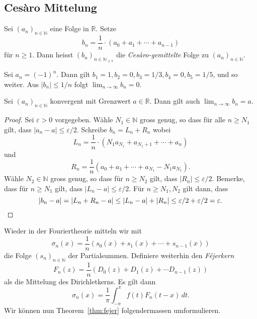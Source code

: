 \documentclass[../main.tex]{subfiles}
\begin{document}
\subsection*{Cesàro Mittelung}

\begin{definition}
  Sei ${(a_{n})}_{n \in \mathbb{N}}$ eine Folge in $\mathbb{R}$. Setze
  \[
    b_n = \frac{1}{n} \cdot (a_0 + a_1 + \cdots + a_{n-1})
  \]
  für $n \geq 1$.
  Dann heisst ${(b_{n})}_{n \in \mathbb{N_{\geq 1}}}$ die \emph{Cesàro-gemittelte}
  Folge zu ${(a_{n})}_{n \in \mathbb{N}}$.
\end{definition}

\begin{example}
  Sei $a_n = {(-1)}^n$. Dann gilt
  $b_1 = 1, b_2 = 0, b_3 = 1/3, b_4 = 0, b_5 = 1/5$, und so weiter.
  Aus $|b_n| \leq 1/n$ folgt $\lim_{n \to \infty} b_n = 0$.
\end{example}

\begin{lemma}\label{lem:cesaro-converges}
  Sei ${(a_{n})}_{n \in \mathbb{N}}$ konvergent mit Grenzwert $a \in \mathbb{R}$.
  Dann gilt auch $\lim_{n \to \infty} b_n = a$.
\end{lemma}

\begin{proof}
  Sei $\varepsilon > 0$ vorgegeben.
  Wähle $N_1 \in \mathbb{N}$ gross genug, so dass für alle $n \geq N_1$ gilt, dass
  $|a_n - a| \leq \varepsilon/2$.
  Schreibe $b_n = L_n + R_n$ wobei
  \[
    L_n = \frac{1}{n} \cdot (N_1 a_{N_1}  + a_{N_1 + 1} + \cdots + a_n)
  \]
  und
  \[
    R_n = \frac{1}{n} (a_0 + a_1 + \cdots + a_{N_1} - N_1 a_{N_1}).
  \]
  Wähle $N_2 \in \mathbb{N}$ gross genug, so dass für $n \geq N_2$ gilt,
  dass $|R_n| \leq \varepsilon/2$.
  Bemerke, dass für $n \geq N_1$ gilt, dass
  \(
    |L_n - a| \leq \varepsilon/2.
  \)
  Für $n \geq N_1, N_2$ gilt dann, dass
  \[
    |b_n - a| 
    = |L_n + R_n - a| \leq |L_n - a| + |R_n| \leq \varepsilon / 2 + \varepsilon/2 
    = \varepsilon. \qedhere
  \]
\end{proof}

Wieder in der Fouriertheorie mitteln wir mit
\[
  \sigma_n(x) = \frac{1}{n}(s_0 (x) + s_1(x) + \cdots + s_{n-1}(x))
\]
die Folge ${(s_{n})}_{n \in \mathbb{N}}$ der Partialsummen. Definiere
weiterhin den \emph{Féjerkern}
\[
  F_n(z) = \frac{1}{n}(D_0(z) + D_1(z) + \cdots D_{n-1}(z))
\]
als die Mittelung des Dirichletkerns. Es gilt dann
\[
  \sigma_n(x) = \frac{1}{\pi} \int_{-\pi}^{\pi} f(t) F_n(t-x) \, dt.
\]
Wir können nun Theorem~\ref{thm:fejer} folgendermassen umformulieren.
\end{document}
